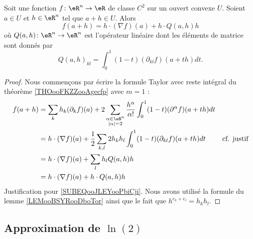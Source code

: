 \begin{proposition}[Taylor à l'ordre \( m=1\)\cite{MonCerveau}]		\label{PROPooJFSRooGJcLyv}
	Soit une fonction \(f \colon \eR^n\to \eR  \) de classe \( C^{2}\) sur un ouvert convexe \( U\). Soient \( a\in U\) et \( h\in \eR^n\) tel que \( a+h\in U\). Alors
	\begin{equation}
		f(a+h)=h\cdot (\nabla f)(a)+h\cdot Q(a,h)h
	\end{equation}
	où \(Q(a,h) \colon \eR^n\to \eR^n  \) est l'opérateur linéaire dont les éléments de matrice sont donnés par
	\begin{equation}
		Q(a,h)_{kl}=\int_0^1(1-t)(\partial_{kl}f)(a+th)dt.
	\end{equation}
\end{proposition}

\begin{proof}
	Nous commençons par écrire la formule Taylor avec reste intégral du théorème \ref{THOooFKZZooAgecfp} avec \( m=1\) :
	\begin{subequations}
		\begin{align}
			f(a+h) & =\sum_kh_k(\partial_kf)(a)+2\sum_{\substack{ \alpha\in \eN^n                                                                                \\ | \alpha |=2 }  }\frac{ h^{\alpha} }{ \alpha! }\int_0^1(1-t)(\partial^{\alpha}f)(a+th)dt\\
			       & =  h\cdot(\nabla f)(a)+  \frac{ 1 }{2}\sum_{k,l}2h_kh_l\int_0^1(1-t)(\partial_{kl}f)(a+th)dt & \text{cf. justif}		\label{SUBEQooJLEYooPbiCji} \\
			       & = h\cdot(\nabla f)(a)+\sum_lh_lQ(a,h)h                                                                                                      \\
			       & = h\cdot(\nabla f)(a)+h\cdot Q(a,h)h                                                                                                        \\
		\end{align}
	\end{subequations}
	Justification pour \eqref{SUBEQooJLEYooPbiCji}. Nous avons utilisé la formule du lemme \ref{LEMooBSYRooDboTor} ainsi que le fait que \( h^{e_k+e_l}=h_kh_l\).
\end{proof}


\subsection{Approximation de \texorpdfstring{\(  \ln(2)\)}{ln(2)}}

